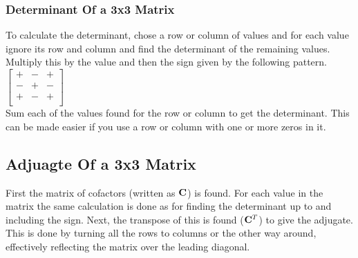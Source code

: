 \documentclass[a4paper,12pt]{article}
\begin{document}
\subsubsection*{Determinant Of a 3x3 Matrix}
To calculate the determinant, chose a row or column of values and for each value ignore its row and column and find the determinant of the remaining values. Multiply this by the value and then the sign given by the following pattern. \\ 
$\begin{bmatrix}
+ & - & + \\
- & + & - \\
+ & - & + \\
\end{bmatrix} $ \\
Sum each of the values found for the row or column to get the determinant. This can be made easier if you use a row or column with one or more zeros in it. 
\subsection*{Adjuagte Of a 3x3 Matrix}
First the matrix of cofactors (written as $\bold{C}$) is found. For each value in the matrix the same calculation is done as for finding the determinant up to and including the sign. Next, the transpose of this is found ($\bold{C}^T$) to give the adjugate. This is done by turning all the rows to columns or the other way around, effectively reflecting the matrix over the leading diagonal.  
\end{document}
